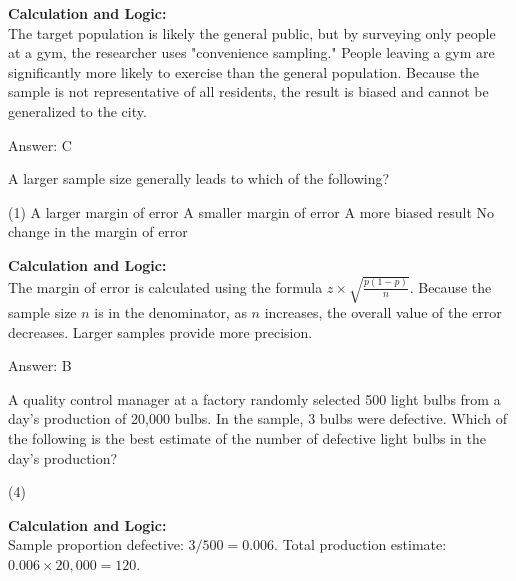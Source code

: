 \documentclass[11pt,paper=a4,answers]{exam}
\begin{document}
\begin{questions}
\begin{solution}
\textbf{Calculation and Logic:} \\
The target population is likely the general public, but by surveying only people at a gym, the researcher uses "convenience sampling." People leaving a gym are significantly more likely to exercise than the general population. Because the sample is not representative of all residents, the result is biased and cannot be generalized to the city.

\vspace{30pt}

Answer: \colorbox{yellow!100}{C}
\end{solution}

\vspace{60pt}

\question
A larger sample size generally leads to which of the following?
\begin{tasks}(1)
    \task A larger margin of error
    \task A smaller margin of error
    \task A more biased result
    \task No change in the margin of error
\end{tasks}

\begin{solution}
\textbf{Calculation and Logic:} \\
The margin of error is calculated using the formula $z \times \sqrt{\frac{p(1-p)}{n}}$. Because the sample size $n$ is in the denominator, as $n$ increases, the overall value of the error decreases. Larger samples provide more precision.

\vspace{30pt}

Answer: \colorbox{yellow!100}{B}
\end{solution}

\vspace{60pt}

\question
A quality control manager at a factory randomly selected 500 light bulbs from a day's production of 20,000 bulbs. In the sample, 3 bulbs were defective. Which of the following is the best estimate of the number of defective light bulbs in the day's production?
\begin{tasks}(4)
\end{tasks}

\begin{solution}
\textbf{Calculation and Logic:} \\
Sample proportion defective: $3 / 500 = 0.006$. Total production estimate: $0.006 \times 20,000 = 120$.


\end{solution}
\end{questions}
\end{document}
